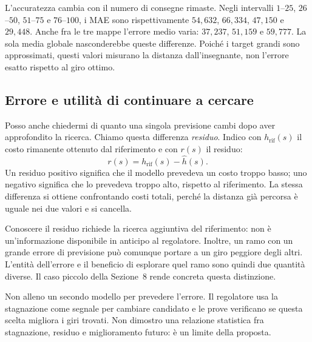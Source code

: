 L'accuratezza cambia con il numero di consegne rimaste. Negli intervalli
$1$--$25$, $26$--$50$, $51$--$75$ e $76$--$100$, i MAE sono rispettivamente
$54{,}632$, $66{,}334$, $47{,}150$ e $29{,}448$.
Anche fra le tre mappe l'errore medio varia: $37{,}237$, $51{,}159$ e
$59{,}777$. La sola media globale nasconderebbe queste differenze.
Poiché i target grandi sono approssimati, questi valori misurano la distanza
dall'insegnante, non l'errore esatto rispetto al giro ottimo.

\subsection{Errore e utilità di continuare a cercare}
Posso anche chiedermi di quanto una singola previsione cambi dopo aver
approfondito la ricerca. Chiamo questa differenza \emph{residuo}.
Indico con $h_{\mathrm{rif}}(s)$ il costo rimanente ottenuto dal riferimento
e con $r(s)$ il residuo:
\[
 r(s)=h_{\mathrm{rif}}(s)-\widehat h(s).
\]
Un residuo positivo significa che il modello prevedeva un costo troppo
basso; uno negativo significa che lo prevedeva troppo alto, rispetto
al riferimento. La stessa differenza si ottiene confrontando costi totali,
perché la distanza già percorsa è uguale nei due valori e si cancella.

Conoscere il residuo richiede la ricerca aggiuntiva del riferimento:
non è un'informazione disponibile in anticipo al regolatore.
Inoltre, un ramo con un grande errore di previsione può comunque portare
a un giro peggiore degli altri. L'entità dell'errore e il beneficio di
esplorare quel ramo sono quindi due quantità diverse.
Il caso piccolo della Sezione~8 rende concreta questa distinzione.

Non alleno un secondo modello per prevedere l'errore. Il regolatore usa
la stagnazione come segnale per cambiare candidato e le prove verificano
se questa scelta migliora i giri trovati. Non dimostro una relazione
statistica fra stagnazione, residuo e miglioramento futuro: è un limite
della proposta.
